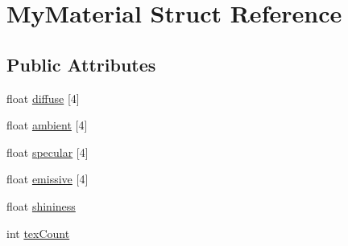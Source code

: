 \hypertarget{structMyMaterial}{\section{My\-Material Struct Reference}
\label{structMyMaterial}
}
\subsection*{Public Attributes}
\begin{DoxyCompactItemize}
\item 
float \hyperlink{structMyMaterial_ad0a8c69f12ec13fbc68bd983529cffbf}{diffuse} \mbox{[}4\mbox{]}
\item 
float \hyperlink{structMyMaterial_ae313e57725574416d97b902bf908a6df}{ambient} \mbox{[}4\mbox{]}
\item 
float \hyperlink{structMyMaterial_a58e5e9f9a5e025b3f768f6a95fc73b63}{specular} \mbox{[}4\mbox{]}
\item 
float \hyperlink{structMyMaterial_aecb2b9b55df581dabddaed5d7fdcdf3c}{emissive} \mbox{[}4\mbox{]}
\item 
float \hyperlink{structMyMaterial_a09fbe1259a7a3b62ced01a543e0a09b0}{shininess}
\item 
int \hyperlink{structMyMaterial_a6e14fca3bb658a2cf433b78b84985e68}{tex\-Count}
\end{DoxyCompactItemize}



